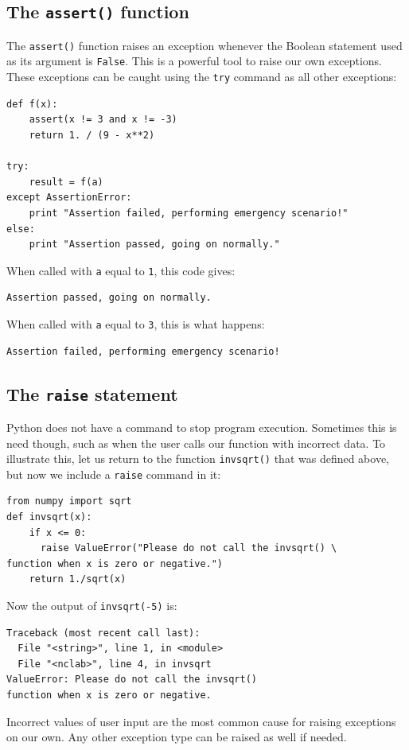 \subsection{The {\tt assert()} function}

The {\tt assert()} function raises an exception whenever the Boolean 
statement used as its argument is {\tt False}. This is a powerful tool to raise our own 
exceptions. These exceptions can be caught using the {\tt try} command 
as all other exceptions:

\begin{verbatim}
def f(x):
    assert(x != 3 and x != -3)
    return 1. / (9 - x**2)

try:
    result = f(a)
except AssertionError:
    print "Assertion failed, performing emergency scenario!"
else:
    print "Assertion passed, going on normally."
\end{verbatim}
When called with {\tt a} equal to {\tt 1}, this code gives:

\begin{verbatim}
Assertion passed, going on normally.
\end{verbatim}
When called with {\tt a} equal to {\tt 3}, this is what happens:

\begin{verbatim}
Assertion failed, performing emergency scenario!
\end{verbatim}

\subsection{The {\tt raise} statement}

Python does not have a command to stop program execution. Sometimes this is
need though, such as when the user calls our function with incorrect data. 
To illustrate this, let us return to the function {\tt invsqrt()} that was 
defined above, but now we include a {\tt raise} command in it:
 
\begin{verbatim}
from numpy import sqrt
def invsqrt(x):
    if x <= 0:
      raise ValueError("Please do not call the invsqrt() \
function when x is zero or negative.")
    return 1./sqrt(x)
\end{verbatim}
Now the output of {\tt invsqrt(-5)} is:

\begin{verbatim}
Traceback (most recent call last):
  File "<string>", line 1, in <module>
  File "<nclab>", line 4, in invsqrt
ValueError: Please do not call the invsqrt() 
function when x is zero or negative.
\end{verbatim}
Incorrect values of user input are the most common cause for raising 
exceptions on our own. Any other exception type can be raised as well
if needed.

